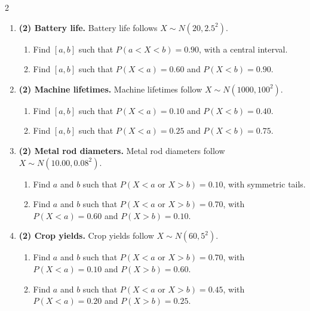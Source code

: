 \begin{multicols}{2}
\begin{enumerate}[label=\textbf{\arabic*)}]
\begin{enumerate}[label=\textbf{\alph*)}]
        \item Find \(x\) such that \(P(X>x)=0.90\).
    \end{enumerate}
    \item \textbf{(2) Battery life.} Battery life follows \(X\sim N(20,2.5^2)\).
    \begin{enumerate}[label=\textbf{\alph*)}]
        \item Find \([a,b]\) such that \(P(a<X<b)=0.90\), with a central interval.
        \item Find \([a,b]\) such that \(P(X<a)=0.60\) and \(P(X<b)=0.90\).
    \end{enumerate}
    \item \textbf{(2) Machine lifetimes.} Machine lifetimes follow \(X\sim N(1000,100^2)\).
    \begin{enumerate}[label=\textbf{\alph*)}]
        \item Find \([a,b]\) such that \(P(X<a)=0.10\) and \(P(X<b)=0.40\).
        \item Find \([a,b]\) such that \(P(X<a)=0.25\) and \(P(X<b)=0.75\).
    \end{enumerate}
    \item \textbf{(2) Metal rod diameters.} Metal rod diameters follow \(X\sim N(10.00,0.08^2)\).
    \begin{enumerate}[label=\textbf{\alph*)}]
        \item Find \(a\) and \(b\) such that \(P(X<a\text{ or }X>b)=0.10\), with symmetric tails.
        \item Find \(a\) and \(b\) such that \(P(X<a\text{ or }X>b)=0.70\), with \(P(X<a)=0.60\) and \(P(X>b)=0.10\).
    \end{enumerate}
    \item \textbf{(2) Crop yields.} Crop yields follow \(X\sim N(60,5^2)\).
    \begin{enumerate}[label=\textbf{\alph*)}]
        \item Find \(a\) and \(b\) such that \(P(X<a\text{ or }X>b)=0.70\), with \(P(X<a)=0.10\) and \(P(X>b)=0.60\).
        \item Find \(a\) and \(b\) such that \(P(X<a\text{ or }X>b)=0.45\), with \(P(X<a)=0.20\) and \(P(X>b)=0.25\).
    \end{enumerate}
\end{enumerate}

\end{multicols}


